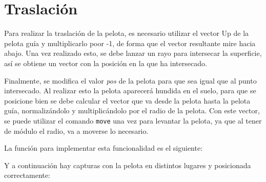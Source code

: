 \section{Traslación}

Para realizar la traslación de la pelota, es necesario utilizar el vector Up de la pelota guía y multiplicarlo poor -1, de forma que el vector resultante mire hacia abajo. Una vez realizado esto, se debe lanzar un rayo para intersecar la superficie, así se obtiene un vector con la posición en la que ha intersecado.

\bigskip

Finalmente, se modifica el valor \textit{pos} de la pelota para que sea igual que al punto intersecado. Al realizar esto la pelota aparecerá hundida en el suelo, para que se posicione bien se debe calcular el vector que va desde la pelota hasta la pelota guía, normalizándolo y multiplicándolo por el radio de la pelota. Con este vector, se puede utilizar el comando \verb|move| una vez para levantar la pelota, ya que al tener de módulo el radio, va a moverse lo necesario.



La función para implementar esta funcionalidad es el siguiente:




Y a continuación hay capturas con la pelota en distintos lugares y posicionada correctamente:

